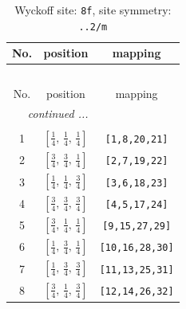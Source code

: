 \documentclass[fleqn,8pt]{jsarticle}
\begin{document}
\begin{longtable}{ccc}
\caption{Wyckoff site: {\tt 8f}, site symmetry: {\tt ..2/m}}
 \\
 \hline \hline
No. & position & mapping \\ \hline \endfirsthead

\multicolumn{2}{l}{\tablename\ \thetable{}} \\
 \hline \hline
No. & position & mapping \\ \hline \endhead

 \hline \hline
\multicolumn{2}{r}{\footnotesize\it continued ...} \\ \endfoot

 \hline \hline
\multicolumn{2}{r}{} \\ \endlastfoot

1 & $\left[ \frac{1}{4},\, \frac{1}{4},\, \frac{1}{4} \right]$ & {\tt [1,8,20,21]} \\ \hline
2 & $\left[ \frac{3}{4},\, \frac{3}{4},\, \frac{1}{4} \right]$ & {\tt [2,7,19,22]} \\ \hline
3 & $\left[ \frac{1}{4},\, \frac{1}{4},\, \frac{3}{4} \right]$ & {\tt [3,6,18,23]} \\ \hline
4 & $\left[ \frac{3}{4},\, \frac{3}{4},\, \frac{3}{4} \right]$ & {\tt [4,5,17,24]} \\ \hline
5 & $\left[ \frac{3}{4},\, \frac{1}{4},\, \frac{1}{4} \right]$ & {\tt [9,15,27,29]} \\ \hline
6 & $\left[ \frac{1}{4},\, \frac{3}{4},\, \frac{1}{4} \right]$ & {\tt [10,16,28,30]} \\ \hline
7 & $\left[ \frac{1}{4},\, \frac{3}{4},\, \frac{3}{4} \right]$ & {\tt [11,13,25,31]} \\ \hline
8 & $\left[ \frac{3}{4},\, \frac{1}{4},\, \frac{3}{4} \right]$ & {\tt [12,14,26,32]} \\
\end{longtable}
\renewcommand{\arraystretch}{1.2}
\end{document}
